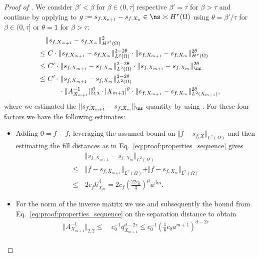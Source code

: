 \documentclass[a4paper, 10pt]{article}
\begin{document}
\begin{proof}[Proof of ]
%
We consider $\beta' < \beta$ for $\beta \in (0, \tau]$ respective $\beta'=\tau$ for $\beta > \tau$ and 
continue by applying  to $g := s_{f, X_{n+1}} - s_{f, X_n} \in \ns \asymp H^\tau(\Omega)$ using $\theta = \beta'/\tau$ for $\beta \in (0, \tau]$ or $\theta = 1$ for $\beta > \tau$:
%
\begin{align}
\begin{aligned}
\label{eq:application_hoelder}
&\Vert s_{f, X_{m+1}} - s_{f, X_{m}} \Vert_{H^{\beta'}(\Omega)}^2 \\
\leq& ~ C \cdot \Vert s_{f, X_{m+1}} - s_{f, X_{m}} \Vert_{L^2(\Omega)}^{2 - 2\theta} \cdot \Vert s_{f, X_{m+1}} - s_{f, X_{m}} \Vert_{H^\tau(\Omega)}^{2\theta} \\
\leq& ~ C' \cdot\Vert s_{f, X_{m+1}} - s_{f, X_{m}} \Vert_{L^2(\Omega)}^{2 - 2\theta} \cdot \Vert s_{f, X_{m+1}} - s_{f, X_{m}} \Vert_{\ns}^{2\theta} \\
\leq& ~ C' \cdot \Vert s_{f, X_{m+1}} - s_{f, X_{m}} \Vert_{L^2(\Omega)}^{2 - 2\theta} \\ 
&\qquad \cdot \Vert A_{X_{m+1}}^{-1} \Vert_{2,2}^{\theta} \cdot |X_{m+1}|^{\theta} \cdot \Vert s_{f, X_{m+1}} - s_{f, X_{m}} \Vert_{L^2(X_{m+1})}^{2\theta},
\end{aligned}
\end{align}
where we estimated the $\Vert s_{f, X_{m+1}} - s_{f, X_{m}} \Vert_{\ns}$ quantity by using .
%
%
%
For these four factors we have the following estimates:
%
\begin{itemize}
\item Adding $0 = f - f$, leveraging the assumed bound on $\Vert f - s_{f, X} \Vert_{L^2(\Omega)}$ and then estimating the fill distances as in Eq.\ \eqref{eq:proof:properties_sequence} gives
\begin{align*}
&\Vert s_{f, X_{m+1}} - s_{f, X_{m}} \Vert_{L^2(\Omega)} \\
\leq \, &\Vert f - s_{f, X_{m+1}} \Vert_{L^2(\Omega)} + \Vert f - s_{f, X_{m}} \Vert_{L^2(\Omega)} \\
\leq \, &2c_f h_{X_m}^{\beta} = 2c_f \left( \frac{22c_0}{3} \right)^\mu a^{\beta m}.
\end{align*}
\item For the norm of the inverse matrix we use  and subsequently the bound from Eq.\ \eqref{eq:proof:properties_sequence} on the separation distance to obtain
\begin{align*}
\Vert A_{X_{m+1}}^{-1} \Vert_{2,2} \leq& ~ c_0^{-1} q_{X_{m+1}}^{d-2\tau} \leq c_0^{-1} \left(\frac{1}{6} c_0 a^{m+1} \right)^{d-2\tau} \\

\end{align*}
\end{itemize}
\end{proof}
\end{document}
